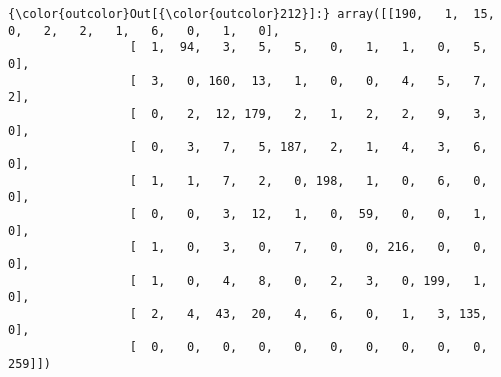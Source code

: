 \documentclass[11pt]{article}
\begin{document}
\begin{Verbatim}[commandchars=\\\{\}]
{\color{outcolor}Out[{\color{outcolor}212}]:} array([[190,   1,  15,   0,   2,   2,   1,   6,   0,   1,   0],
                 [  1,  94,   3,   5,   5,   0,   1,   1,   0,   5,   0],
                 [  3,   0, 160,  13,   1,   0,   0,   4,   5,   7,   2],
                 [  0,   2,  12, 179,   2,   1,   2,   2,   9,   3,   0],
                 [  0,   3,   7,   5, 187,   2,   1,   4,   3,   6,   0],
                 [  1,   1,   7,   2,   0, 198,   1,   0,   6,   0,   0],
                 [  0,   0,   3,  12,   1,   0,  59,   0,   0,   1,   0],
                 [  1,   0,   3,   0,   7,   0,   0, 216,   0,   0,   0],
                 [  1,   0,   4,   8,   0,   2,   3,   0, 199,   1,   0],
                 [  2,   4,  43,  20,   4,   6,   0,   1,   3, 135,   0],
                 [  0,   0,   0,   0,   0,   0,   0,   0,   0,   0, 259]])
\end{Verbatim}
            

    
    
    
    
\end{document}
